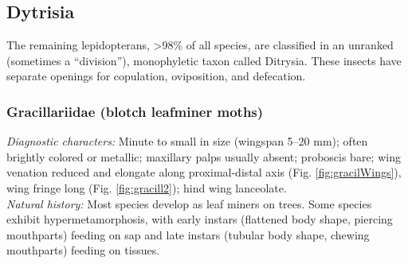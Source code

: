 \documentclass[letterpaper, 11pt]{article}
\begin{document}
\subsection{Dytrisia}
The remaining lepidopterans, \textgreater98\% of all species, are classified in an unranked (sometimes a ``division''), monophyletic taxon called Ditrysia. These insects have separate openings for copulation, oviposition, and defecation.

\subsubsection{Gracillariidae (blotch leafminer moths)}
\noindent{}\textit{Diagnostic characters:} Minute to small in size (wingspan 5--20 mm); often brightly colored or metallic; maxillary palps usually absent; proboscis bare; wing venation reduced and elongate along proximal-distal axis (Fig. \ref{fig:gracilWings}), wing fringe long (Fig. \ref{fig:gracill2}); hind wing lanceolate.\\

\noindent{}\textit{Natural history:} Most species develop as leaf miners on trees. Some species exhibit hypermetamorphosis, with early instars (flattened body shape, piercing mouthparts) feeding on sap and late instars (tubular body shape, chewing mouthparts) feeding on tissues.
\end{document}
